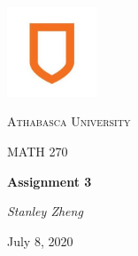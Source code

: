 \documentclass[11pt, letterpaper, twoside]{article}
\begin{document}
\begin{titlepage}
	\centering
	\vspace*{60px}
	\hspace{0pt}
	\includegraphics[width=0.2\textwidth]{logo}\par\vspace{1cm}
	{\scshape\LARGE Athabasca University \par}
	\vspace{1cm}
	{\scshape\Large MATH 270\par}
	\vspace{1.5cm}
	{\huge\bfseries Assignment 3\par}
	\vspace{2cm}
	{\Large\itshape Stanley Zheng\par}
	\vfill
	{\large July 8, 2020\par}
	\vspace*{50px}
	\hspace{0pt}
\pagebreak
\end{titlepage}
\end{document}
